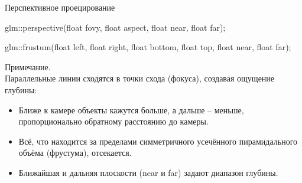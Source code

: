 \documentclass{beamer}
\begin{document}
	\begin{frame}{Перспективное проецирование}

		glm::perspective(float fovy, float aspect, float near, float far);
		
		glm::frustum(float left, float right, float bottom, float top, float near, float far);

		\vspace{0.5cm}
		Примечание.\\
		Параллельные линии сходятся в точки схода (фокуса), создавая ощущение глубины:
		\begin{itemize}
			\item Ближе к камере объекты кажутся больше, а дальше – меньше, пропорционально обратному расстоянию до камеры.
			\item Всё, что находится за пределами симметричного усечённого пирамидального объёма (фрустума), отсекается.
			\item Ближайшая и дальняя плоскости (near и far) задают диапазон глубины.
		\end{itemize}

	\end{frame}
\end{document}
